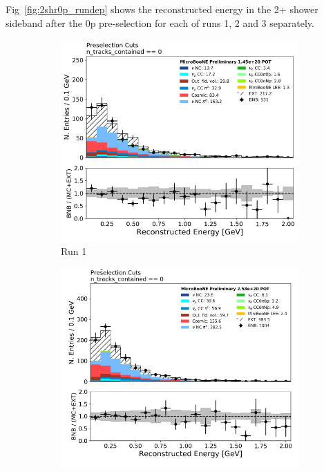 Fig~\ref{fig:2shr0p_rundep} shows the reconstructed energy in the 2+ shower sideband after the 0p pre-selection for each of runs 1, 2 and 3 separately.
\begin{figure}[H]
    \centering
    \begin{subfigure}{0.3\textwidth}
    \includegraphics[width=1.0\textwidth]{Sidebands/Figures/twoshr_0p_timedep/run1_recoe.pdf}
    \caption{Run 1}
    \end{subfigure}
    \begin{subfigure}{0.3\textwidth}
    \includegraphics[width=1.0\textwidth]{Sidebands/Figures/twoshr_0p_timedep/run2_recoe.pdf}

\end{subfigure}
\end{figure}
